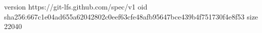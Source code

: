 version https://git-lfs.github.com/spec/v1
oid sha256:667c1e04ad655a62042802c0eef63cfe48afb95647bce439b4f751730f4e8f53
size 22040
